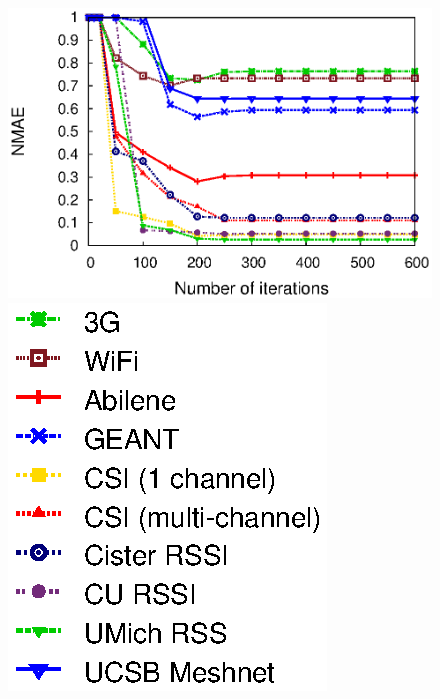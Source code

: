 \begin{figure}[h!]
  \centering
  \includegraphics[width=\figurewidthB]{fig_lens3/vary_iter.eps}
  \includegraphics[width=0.27\columnwidth]{fig_lens3/legend_iter.eps}

\end{figure}
